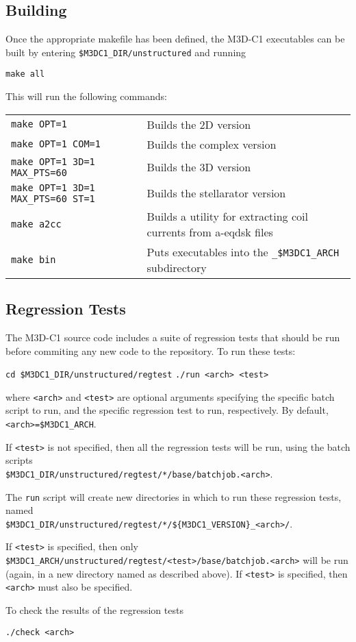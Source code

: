 \subsection{Building}

Once the appropriate makefile has been defined, the M3D-C1 executables
can be built by entering \texttt{\$M3DC1\_DIR/unstructured} and
running

\texttt{make all}

This will run the following commands:

\begin{tabular}{ll}
\texttt{make OPT=1} & Builds the 2D version\\
\texttt{make OPT=1 COM=1} & Builds the complex version\\
\texttt{make OPT=1 3D=1 MAX\_PTS=60} & Builds the 3D version\\
\texttt{make OPT=1 3D=1 MAX\_PTS=60 ST=1} & Builds the stellarator version\\
\texttt{make a2cc} & Builds a utility for extracting coil currents
from a-eqdsk files\\
\texttt{make bin} & Puts executables into the \texttt{\_\$M3DC1\_ARCH} subdirectory\\
\end{tabular}


\subsection{Regression Tests}

The M3D-C1 source code includes a suite of regression tests that
should be run before commiting any new code to the repository.  To run
these tests:

\texttt{cd \$M3DC1\_DIR/unstructured/regtest}
\texttt{./run <arch> <test>}

where \texttt{<arch>} and \texttt{<test>} are optional arguments
specifying the specific batch script to run, and the specific
regression test to run, respectively.  By default,
\texttt{<arch>=\$M3DC1\_ARCH}.

If \texttt{<test>} is not
specified, then all the regression tests will be run, using the batch
scripts\\
\texttt{\$M3DC1\_DIR/unstructured/regtest/*/base/batchjob.<arch>}.

The \texttt{run} script will create new directories in which to run
these regression tests, named\\
\texttt{\$M3DC1\_DIR/unstructured/regtest/*/\$\{M3DC1\_VERSION\}\_<arch>/}.

If \texttt{<test>} is specified, then only
\texttt{\$M3DC1\_ARCH/unstructured/regtest/<test>/base/batchjob.<arch>}
will be run (again, in a new directory named as described above).  If
\texttt{<test>} is specified, then \texttt{<arch>} must also be
specified.

To check the results of the regression tests

\texttt{./check <arch>}


